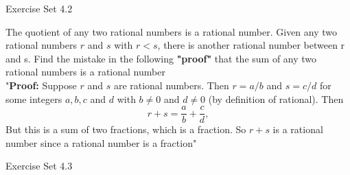 \documentclass[12pt,letterpaper, onecolumn]{exam}
\begin{document}
	\centering\large Exercise Set 4.2\\
	\begin{questions}
		\setcounter{question}{15} \question The quotient of any two rational numbers is a rational number.
		\setcounter{question}{19} \question Given any two rational numbers $r$ and $s$ with $r<s$, there is another rational number between r and s.
		\setcounter{question}{37} \question   Find the mistake in the following \textbf{"proof"} that the sum of any two rational numbers is a rational number\\

		"\textbf{Proof:} Suppose $r$ and $s$ are rational numbers. Then $r=a/b$ and $s=c/d$ for some integers $a, b, c$ and $d$ with $b \neq 0$ and $d \neq 0$ (by definition of rational). Then $$r+s=\frac{a}{b}+\frac{c}{d},$$ But this is a sum of two fractions, which is a fraction. So $r+s$ is a rational number since a rational number is a fraction"\\ 
		
	\end{questions}
	\centering\large Exercise Set 4.3
\end{document}
